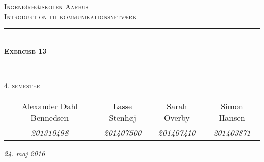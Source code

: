 \newcommand{\HRule}{\rule{\linewidth}{0.1mm}} %
	
\begin{center}
	
\textsc{\LARGE Ingeniørhøjskolen Aarhus}\\[1.5cm] %

\textsc{\large Introduktion til kommunikationsnetværk}\\[2.5cm] 
\HRule \\[0.8cm]
{\huge \bfseries \textsc{Exercise 13}}\\[0.4cm]
\HRule \\[1.5cm]

\textsc{\large 4. semester}\\
\vspace{0.5 in}
\begin{tabular}{c c c c}
	Alexander Dahl Bennedsen & Lasse Stenhøj & Sarah Overby &  Simon Hansen   \\
	\textsl{201310498} & \textsl{201407500} &\textsl{201407410} & \textsl{201403871}
\end{tabular}

\vspace{2.5 in}

{\large\textit{24. maj 2016}} \\[3cm]
\vfill %
\end{center} %